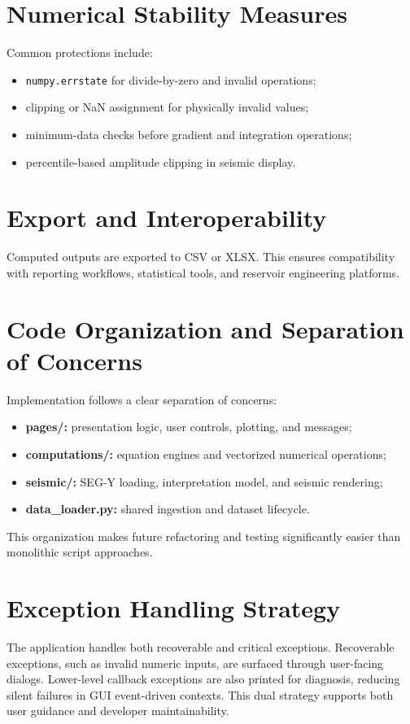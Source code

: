 \documentclass[12pt,a4paper]{report}
\begin{document}
\section{Numerical Stability Measures}
Common protections include:
\begin{itemize}
    \item \texttt{numpy.errstate} for divide-by-zero and invalid operations;
    \item clipping or NaN assignment for physically invalid values;
    \item minimum-data checks before gradient and integration operations;
    \item percentile-based amplitude clipping in seismic display.
\end{itemize}

\section{Export and Interoperability}
Computed outputs are exported to CSV or XLSX. This ensures compatibility with reporting workflows, statistical tools, and reservoir engineering platforms.

\section{Code Organization and Separation of Concerns}
Implementation follows a clear separation of concerns:
\begin{itemize}
    \item \textbf{pages/:} presentation logic, user controls, plotting, and messages;
    \item \textbf{computations/:} equation engines and vectorized numerical operations;
    \item \textbf{seismic/:} SEG-Y loading, interpretation model, and seismic rendering;
    \item \textbf{data\_loader.py:} shared ingestion and dataset lifecycle.
\end{itemize}

This organization makes future refactoring and testing significantly easier than monolithic script approaches.

\section{Exception Handling Strategy}
The application handles both recoverable and critical exceptions. Recoverable exceptions, such as invalid numeric inputs, are surfaced through user-facing dialogs. Lower-level callback exceptions are also printed for diagnosis, reducing silent failures in GUI event-driven contexts. This dual strategy supports both user guidance and developer maintainability.
\end{document}
